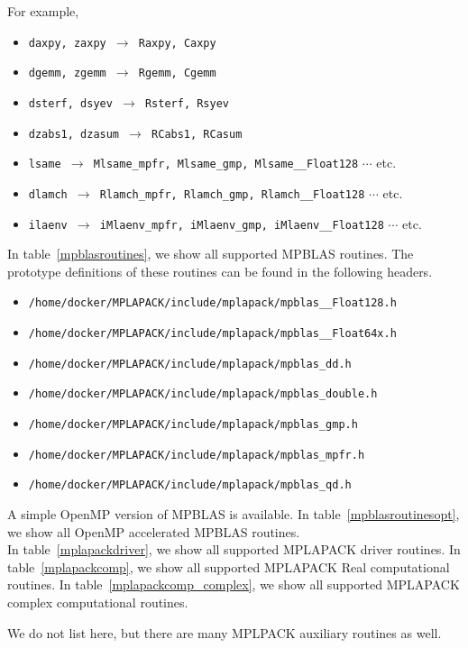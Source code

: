\documentclass[12pt]{article}
\begin{document}
For example, \begin{itemize}
    \item {\tt daxpy, zaxpy $\rightarrow$ Raxpy, Caxpy}
    \item {\tt dgemm, zgemm $\rightarrow$ Rgemm, Cgemm}
    \item {\tt dsterf, dsyev $\rightarrow$ Rsterf, Rsyev}
    \item {\tt dzabs1, dzasum $\rightarrow$ RCabs1, RCasum}
    \item {\tt lsame $\rightarrow$ Mlsame\_mpfr,  Mlsame\_gmp, Mlsame\_\_Float128} $\cdots$ etc.
    \item {\tt dlamch $\rightarrow$ Rlamch\_mpfr,  Rlamch\_gmp, Rlamch\_\_Float128} $\cdots$ etc.
    \item {\tt ilaenv $\rightarrow$ iMlaenv\_mpfr,  iMlaenv\_gmp, iMlaenv\_\_Float128} $\cdots$ etc.
\end{itemize}

In table~\ref{mpblasroutines}, we show all supported MPBLAS routines.
The prototype definitions of these routines can be found in the following headers.
\begin{itemize} 
\item {\tt /home/docker/MPLAPACK/include/mplapack/mpblas\_\_Float128.h}
\item {\tt /home/docker/MPLAPACK/include/mplapack/mpblas\_\_Float64x.h}
\item {\tt /home/docker/MPLAPACK/include/mplapack/mpblas\_dd.h}
\item {\tt /home/docker/MPLAPACK/include/mplapack/mpblas\_double.h}
\item {\tt /home/docker/MPLAPACK/include/mplapack/mpblas\_gmp.h}
\item {\tt /home/docker/MPLAPACK/include/mplapack/mpblas\_mpfr.h}
\item {\tt /home/docker/MPLAPACK/include/mplapack/mpblas\_qd.h}
\end{itemize}
A simple OpenMP version of MPBLAS is available.
In table~\ref{mpblasroutinesopt}, we show all OpenMP accelerated MPBLAS routines. \\

In table~\ref{mplapackdriver}, we show all supported MPLAPACK driver routines.
In table~\ref{mplapackcomp}, we show all supported MPLAPACK Real computational routines.
In table~\ref{mplapackcomp_complex}, we show all supported MPLAPACK complex computational routines.

We do not list here, but there are many MPLPACK auxiliary routines as well.
\end{document}
